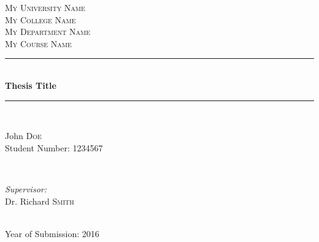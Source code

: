 \documentclass[12pt, a4paper]{report} %
\newcommand{\theuniversity}{My University Name}
\newcommand{\thecollege}{My College Name}
\newcommand{\thedepartment}{My Department Name}
\newcommand{\thecoursetitle}{My Course Name}
\newcommand{\thestudent}{John \textsc{Doe}}
\newcommand{\thestudentid}{1234567}
\newcommand{\thesupervisor}{Dr. Richard \textsc{Smith}}
\newcommand{\theyear}{2016}
\newcommand{\thetitle}{Thesis Title}
\theoremstyle{plain}
\theoremstyle{definition}
\begin{document}
\onehalfspacing


\begin{titlepage}
\center

\textsc{\LARGE \theuniversity} \\[1.5cm] 
\textsc{\large 
\thecollege \\
\thedepartment} \\[1.5cm]
\textsc{\Large \thecoursetitle} \\[3.0cm]

\rule{\linewidth}{0.5mm} \\[0.5cm]
{ \huge\textbf{ \thetitle } } \\
\rule{\linewidth}{0.5mm} \\[6cm]

\begin{minipage}{0.4\textwidth}
\begin{flushleft} \large
\thestudent \\
Student Number: \thestudentid
\end{flushleft}
\end{minipage}
~
\begin{minipage}{0.4\textwidth}
\begin{flushright} \large
\emph{Supervisor:} \\
\thesupervisor
\end{flushright}
\end{minipage}\\[4cm]

{\large Year of Submission: \theyear} \\[3cm] 

\vfill %
\end{titlepage}
\newpage





\tableofcontents
\newpage






\printbibliography
{}

\appendix

		
\end{document}
